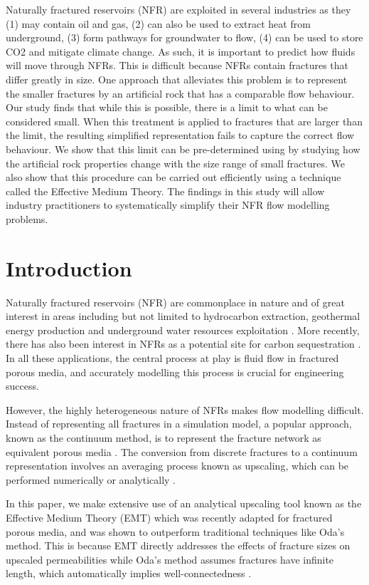\documentclass[a4paper]{article}
\begin{document}
Naturally fractured reservoirs (NFR) are exploited in several industries as they (1) may contain oil and gas, (2) can also be used to extract heat from underground, (3) form pathways for groundwater to flow, (4) can be used to store CO2 and mitigate climate change. As such, it is important to predict how fluids will move through NFRs. This is difficult because NFRs contain fractures that differ greatly in size. One approach that alleviates this problem is to represent the smaller fractures by an artificial rock that has a comparable flow behaviour. Our study finds that while this is possible, there is a limit to what can be considered small. When this treatment is applied to fractures that are larger than the limit, the resulting simplified representation fails to capture the correct flow behaviour. We show that this limit can be pre-determined using by studying how the artificial rock properties change with the size range of small fractures. We also show that this procedure can be carried out efficiently using a technique called the Effective Medium Theory. The findings in this study will allow industry practitioners to systematically simplify their NFR flow modelling problems.

\section{Introduction}
Naturally fractured reservoirs (NFR) are commonplace in nature and of great interest in areas including but not limited to hydrocarbon extraction, geothermal energy production and underground water resources exploitation \citep{Berkowitz2002}. More recently, there has also been 
interest in NFRs as a potential site for carbon sequestration \citep{March2018}. In all these applications, the central process at play is fluid flow in fractured porous media, and accurately modelling this process is crucial for engineering success.

However, the highly heterogeneous nature of NFRs makes flow modelling difficult. Instead of representing all fractures in a simulation model, a popular approach, known as the continuum method, is to represent the fracture network as equivalent porous media \citep{Ezulike2013, Lemonnier2010a, Lemonnier2010, Warren1963, Yan2016}. The conversion from discrete fractures to a continuum representation involves an averaging process known as upscaling, which can be performed numerically or analytically \citep{Durlofsky1991,Oda1985,Renard1997,Saevik2013}. 

In this paper, we make extensive use of an analytical upscaling tool known as the Effective Medium Theory (EMT) which was recently adapted for fractured porous media, and was shown to outperform traditional techniques like Oda's method. This is because EMT directly addresses the effects of fracture sizes on upscaled permeabilities while Oda's method assumes fractures have infinite length, which automatically implies well-connectedness \citep{Oda1985, Saevik2013, Saevik2014}.
\end{document}
